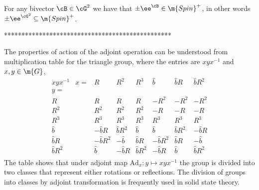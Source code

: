 

For any bivector $\cB\in\cG^2$ we have that
$\pm\ee^{\cB}\in\m{Spin}^{+}$, in other words
$\pm\ee^{\cG^2}\subseteq\m{Spin}^{+}$.

 ************************************************


The properties of  action of the adjoint operation can be
understood from multiplication table for the triangle group, where
the entries  are $xyx^{-1}$ and $x,y\in\m{G}$,
\[\begin{array}{cc|ccccccc}
xyx^{-1}&x=&R&R^2&R^3&\hat{b}&\hat{b}R&\hat{b}R^2\\
y=&&&&&&&\\   \hline
R&&R&R&R&-R^2&-R^2&-R^2\\
R^2&&R^2&R^2&R^2&-R&-R&-R\\
R^3&&R^3&R^3&R^3&R^3&R^3&R^3\\
\hat{b}&&-\hat{b}R&\hat{b}R^2&\hat{b}&\hat{b}&\hat{b}R^2&-\hat{b}R\\
\hat{b}R&&-\hat{b}R^2&-\hat{b}&\hat{b}R&-\hat{b}R^2&\hat{b}R&-\hat{b}\\
\hat{b}R^2&&\hat{b}&-\hat{b}R&\hat{b}R^2&-\hat{b}R&\hat{b}&\hat{b}R^2\\
\end{array}\]
The table shows that under adjoint map $\textrm{Ad}_x:y\mapsto
xyx^{-1}$ the group is divided into two classes that represent
either rotations or reflections. The division of groups into
classes by adjoint transformation is frequently used in solid
state theory.

